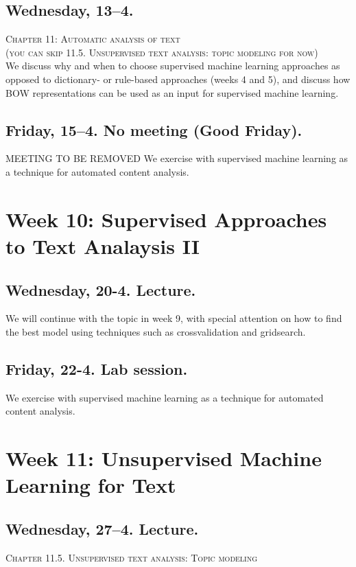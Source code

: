 \subsection*{Wednesday, 13--4.}
\textsc{ Chapter 11: Automatic analysis of text}\\
\textsc{ (you can skip 11.5. Unsupervised text analysis: topic modeling for now)}\\

We discuss why and when to choose supervised machine learning approaches as opposed to dictionary- or rule-based approaches (weeks 4 and 5), and discuss how BOW representations can be used as an input for supervised machine learning.

\subsection*{Friday, 15--4. No meeting (Good Friday).}
MEETING TO BE REMOVED
We exercise with supervised machine learning as a technique for automated content analysis.





\section*{Week 10: Supervised Approaches to Text Analaysis II}

\subsection*{Wednesday, 20-4. Lecture.}
We will continue with the topic in week 9, with special attention on how to find the best model using techniques such as crossvalidation and gridsearch.

\subsection*{Friday, 22-4. Lab session.}
We exercise with supervised machine learning as a technique for automated content analysis.



\section*{Week 11: Unsupervised Machine Learning for Text}

\subsection*{Wednesday, 27--4. Lecture.}
\textsc{ Chapter 11.5. Unsupervised text analysis: Topic modeling}\\


